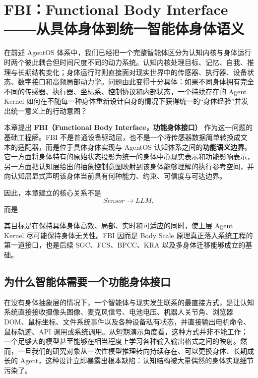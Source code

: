 \chapter{FBI：Functional Body Interface——从具体身体到统一智能体身体语义}

\begin{chapterlead}
在前述 AgentOS 体系中，我们已经把一个完整智能体区分为认知内核与身体运行时两个彼此耦合但时间尺度不同的动力系统。认知内核处理目标、记忆、自我、推理与长期结构变化；身体运行时则直接面对现实世界中的传感器、执行器、设备状态、数字接口和高频局部动力学。问题由此变得十分具体：如果不同身体拥有完全不同的传感器、执行器、坐标系、控制协议和内部状态，一个持续存在的 Agent Kernel 如何在不随每一种身体重新设计自身的情况下获得统一的“身体经验”并发出统一意义上的行动意图？

本章提出 \textbf{FBI（Functional Body Interface，功能身体接口）} 作为这一问题的基础工程解。FBI 不是普通设备驱动层，也不是一个将传感器数据简单转换成文本的适配器，而是位于具体身体实现与 AgentOS 认知体系之间的\textbf{功能语义边界}。它一方面将身体特有的原始状态投影为统一的身体中心现实表示和功能影响表示，另一方面把认知层给出的抽象控制意图映射到该身体能够理解的执行参考空间，并向认知层显式声明该身体当前具有何种能力、约束、可信度与可达边界。

因此，本章建立的核心关系不是
\[
Sensor \rightarrow LLM,
\]
而是
\begin{statementbox}
\centering
{}
\end{statementbox}
其目标是在保持具体身体高效、局部、实时和可适应的同时，使上层 Agent Kernel 尽可能保持身体无关性。FBI 因而是 Body Scale 原理真正落入系统工程的第一道接口，也是后续 SGC、FCS、BPCC、KRA 以及多身体迁移能够成立的基础。
\end{chapterlead}


\section{为什么智能体需要一个功能身体接口}

在没有身体抽象层的情况下，一个智能体与现实发生联系的最直接方式，是让认知系统直接接收摄像头图像、麦克风信号、电池电压、机器人关节角、浏览器 DOM、鼠标坐标、文件系统事件以及各种设备私有状态，并直接输出电机命令、鼠标轨迹、API 调用或系统调用。从短期演示角度看，这种方式并非不能工作；一个足够大的模型甚至能够在相当程度上学习各种输入输出格式之间的映射。然而，一旦我们的研究对象从一次性模型推理转向持续存在、可以更换身体、长期成长的 Agent，这种设计立即暴露出根本缺陷：认知结构被大量偶然的身体实现细节污染了。

